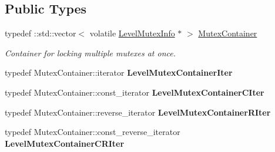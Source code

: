 \subsection*{Public Types}
\begin{DoxyCompactItemize}
\item 
\hypertarget{classLoki_1_1LevelMutexInfo_a76a0315d91234f5066c75660a9f27a7f}{}typedef \+::std\+::vector$<$ volatile \hyperlink{classLoki_1_1LevelMutexInfo}{Level\+Mutex\+Info} $\ast$ $>$ \hyperlink{classLoki_1_1LevelMutexInfo_a76a0315d91234f5066c75660a9f27a7f}{Mutex\+Container}\label{classLoki_1_1LevelMutexInfo_a76a0315d91234f5066c75660a9f27a7f}

\begin{DoxyCompactList}\small\item\em Container for locking multiple mutexes at once. \end{DoxyCompactList}\item 
\hypertarget{classLoki_1_1LevelMutexInfo_a113155a861291e24efb80ecb795ced42}{}typedef Mutex\+Container\+::iterator {\bfseries Level\+Mutex\+Container\+Iter}\label{classLoki_1_1LevelMutexInfo_a113155a861291e24efb80ecb795ced42}

\item 
\hypertarget{classLoki_1_1LevelMutexInfo_a18a0f71a067b3c6028ca10010a740cee}{}typedef Mutex\+Container\+::const\+\_\+iterator {\bfseries Level\+Mutex\+Container\+C\+Iter}\label{classLoki_1_1LevelMutexInfo_a18a0f71a067b3c6028ca10010a740cee}

\item 
\hypertarget{classLoki_1_1LevelMutexInfo_aecc582d1025baad1f014d3604e293b4d}{}typedef Mutex\+Container\+::reverse\+\_\+iterator {\bfseries Level\+Mutex\+Container\+R\+Iter}\label{classLoki_1_1LevelMutexInfo_aecc582d1025baad1f014d3604e293b4d}

\item 
\hypertarget{classLoki_1_1LevelMutexInfo_a4aedd07ffe486369939e0fb4c0bb1074}{}typedef Mutex\+Container\+::const\+\_\+reverse\+\_\+iterator {\bfseries Level\+Mutex\+Container\+C\+R\+Iter}\label{classLoki_1_1LevelMutexInfo_a4aedd07ffe486369939e0fb4c0bb1074}

\end{DoxyCompactItemize}
